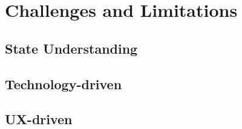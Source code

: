 \section{Challenges and Limitations}
\subsection{State Understanding}
\subsection{Technology-driven}
\subsection{UX-driven}
